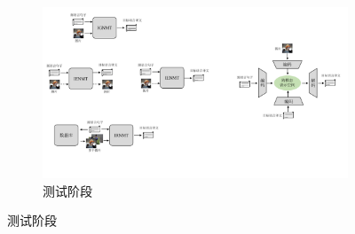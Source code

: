 
\begin{figure}[!htbp]
    \centering
    \begin{subfigure}{0.5\textwidth}
    \end{subfigure}%
    ~%
    \begin{subfigure}[b]{0.5\textwidth}
      \centering
      \includegraphics[width=\textwidth]{Img/fig_2_ienmt_infer.pdf}
      \caption{测试阶段}
      \label{fig:2_ienmt_infer}
    \end{subfigure}
    \label{fig:2_ienmt}
\end{figure}